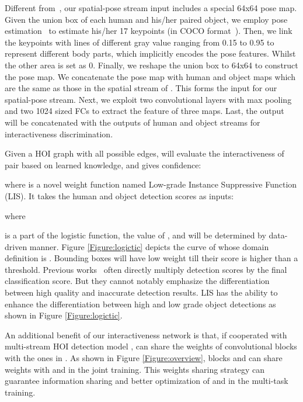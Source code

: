\documentclass[10pt,twocolumn,letterpaper]{article}
\begin{document}
 Different from~\cite{hicodet}, our spatial-pose stream input includes a special 64x64 pose map.
Given the union box of each human and his/her paired object, we employ pose estimation~\cite{fang2017rmpe,crowdpose} to estimate his/her 17 keypoints (in COCO format~\cite{coco}). Then, we link the keypoints with lines of different gray value ranging from 0.15 to 0.95 to represent different body parts, which implicitly encodes the pose features. Whilst the other area is set as 0.
Finally, we reshape the union box to 64x64 to construct the pose map. 
We concatenate the pose map with human and object maps which are the same as those in the spatial stream of . This forms the input for our spatial-pose stream.
Next, we exploit two convolutional layers with max pooling and two 1024 sized FCs to extract the feature  of three maps. Last, the output will be concatenated with the outputs of human and object streams for interactiveness discrimination.

Given a HOI graph  with all possible edges,  will evaluate the interactiveness of pair  based on learned knowledge, and gives confidence:

where    is a novel weight function named Low-grade Instance Suppressive Function (LIS). It takes the human and object detection scores  as inputs:

where

 is a part of the logistic function, the value of ,  and  will be determined by data-driven manner. Figure \ref{Figure:logictic} depicts the curve of  whose domain definition is . Bounding boxes will have low weight till their score is higher than a threshold. Previous works~\cite{gao2018ican,Gkioxari2017Detecting} often directly multiply detection scores by the final classification score. But they cannot notably emphasize the differentiation between high quality and inaccurate detection results. LIS has the ability to enhance the differentiation between high and low grade object detections as shown in Figure \ref{Figure:logictic}. 

 An additional benefit of our interactiveness network is that, if cooperated with multi-stream HOI detection model ,  can share the weights of convolutional blocks with the ones in . As shown in Figure \ref{Figure:overview}, blocks  and  can share weights with  and  in the joint training. This weights sharing strategy can guarantee information sharing and better optimization of  and  in the multi-task training. 
\end{document}
